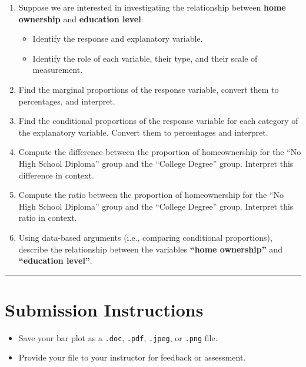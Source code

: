 \documentclass[oneside,openany]{book}
\providecommand{\tightlist}{%
  \setlength{\itemsep}{0pt}\setlength{\parskip}{0pt}}
\begin{document}
\begin{enumerate}
\def\labelenumi{\arabic{enumi}.}
\item
  Suppose we are interested in investigating the relationship between \textbf{home ownership} and \textbf{education level}:

  \begin{itemize}
  \tightlist
  \item
    Identify the response and explanatory variable.
  \item
    Identify the role of each variable, their type, and their scale of measurement.
  \end{itemize}
\item
  Find the marginal proportions of the response variable, convert them to percentages, and interpret.
\item
  Find the conditional proportions of the response variable for each category of the explanatory variable. Convert them to percentages and interpret.
\item
  Compute the difference between the proportion of homeownership for the ``No High School Diploma'' group and the ``College Degree'' group. Interpret this difference in context.
\item
  Compute the ratio between the proportion of homeownership for the ``No High School Diploma'' group and the ``College Degree'' group. Interpret this ratio in context.
\item
  Using data-based arguments (i.e., comparing conditional proportions), describe the relationship between the variables \textbf{``home ownership''} and \textbf{``education level''}.
\end{enumerate}

\begin{center}\rule{0.5\linewidth}{0.5pt}\end{center}

\section{Submission Instructions}\label{submission-instructions}

\begin{itemize}
\tightlist
\item
  Save your bar plot as a \texttt{.doc}, \texttt{.pdf}, \texttt{.jpeg}, or \texttt{.png} file.
\item
  Provide your file to your instructor for feedback or assessment.
\end{itemize}
\end{document}
